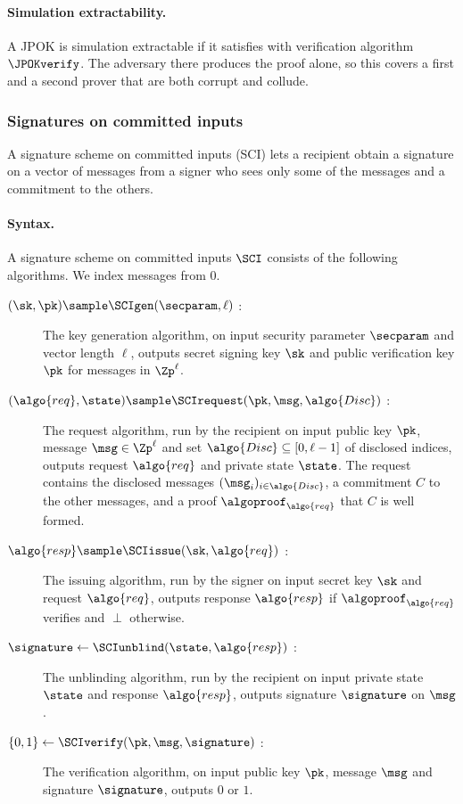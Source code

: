 \paragraph{Simulation extractability.} A JPOK is simulation extractable if it
satisfies  with verification algorithm $\JPOKverify$. The
adversary there produces the proof alone, so this covers a first and a second
prover that are both corrupt and collude.

\subsubsection*{Signatures on committed inputs}

A signature
scheme on committed inputs (SCI) lets a recipient obtain a signature on a vector
of messages from a signer who sees only some of the messages and a commitment
to the others.

\paragraph{Syntax.} A signature scheme on committed inputs $\SCI$ consists of
the following algorithms. We index messages from $0$.

\begin{description}

  \item[$(\sk, \pk) \sample \SCIgen(\secparam, \ell)$ :] The key generation
algorithm, on input security parameter $\secparam$ and vector length $\ell$,
outputs secret signing key $\sk$ and public verification key $\pk$ for messages
in $\Zp^\ell$.

  \item[$(\algo{req}, \state) \sample \SCIrequest(\pk, \msg, \algo{Disc})$ :]
The request algorithm, run by the recipient on input public key $\pk$, message
$\msg \in \Zp^\ell$ and set $\algo{Disc} \subseteq [0, \ell-1]$ of disclosed
indices, outputs request $\algo{req}$ and private state $\state$. The request
contains the disclosed messages $(\msg_i)_{i \in \algo{Disc}}$, a commitment $C$
to the other messages, and a proof $\algoproof_{\algo{req}}$ that $C$ is well
formed.

  \item[$\algo{resp} \sample \SCIissue(\sk, \algo{req})$ :] The issuing
algorithm, run by the signer on input secret key $\sk$ and request
$\algo{req}$, outputs response $\algo{resp}$ if $\algoproof_{\algo{req}}$
verifies and $\perp$ otherwise.

  \item[$\signature \leftarrow \SCIunblind(\state, \algo{resp})$ :] The
unblinding algorithm, run by the recipient on input private state $\state$ and
response $\algo{resp}$, outputs signature $\signature$ on $\msg$.

  \item[$\{0,1\} \leftarrow \SCIverify(\pk, \msg, \signature)$ :] The
verification algorithm, on input public key $\pk$, message $\msg$ and
signature $\signature$, outputs $0$ or $1$.

\end{description}

